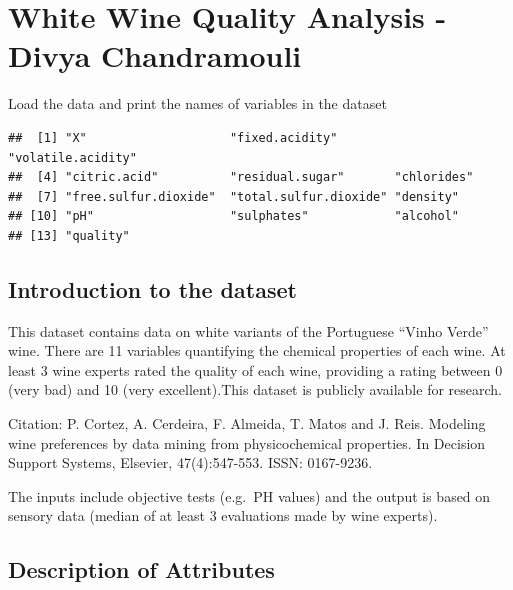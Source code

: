 \documentclass[]{article}
\title{}
\author{}
\date{}
\begin{document}
\section{White Wine Quality Analysis - Divya
Chandramouli}\label{white-wine-quality-analysis---divya-chandramouli}

Load the data and print the names of variables in the dataset

\begin{verbatim}
##  [1] "X"                    "fixed.acidity"        "volatile.acidity"    
##  [4] "citric.acid"          "residual.sugar"       "chlorides"           
##  [7] "free.sulfur.dioxide"  "total.sulfur.dioxide" "density"             
## [10] "pH"                   "sulphates"            "alcohol"             
## [13] "quality"
\end{verbatim}

\subsection{Introduction to the
dataset}\label{introduction-to-the-dataset}

This dataset contains data on white variants of the Portuguese ``Vinho
Verde'' wine. There are 11 variables quantifying the chemical properties
of each wine. At least 3 wine experts rated the quality of each wine,
providing a rating between 0 (very bad) and 10 (very excellent).This
dataset is publicly available for research.

Citation: P. Cortez, A. Cerdeira, F. Almeida, T. Matos and J. Reis.
Modeling wine preferences by data mining from physicochemical
properties. In Decision Support Systems, Elsevier, 47(4):547-553. ISSN:
0167-9236.

The inputs include objective tests (e.g.~PH values) and the output is
based on sensory data (median of at least 3 evaluations made by wine
experts).

\subsection{Description of Attributes}\label{description-of-attributes}
\end{document}

